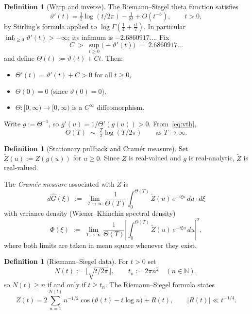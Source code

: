 \documentclass[12pt]{amsart}
\theoremstyle{definition}
\newtheorem{definition}[theorem]{Definition}
\theoremstyle{remark}
\newcommand{\N}{\mathbb{N}}
\newcommand{\Th}{\Theta}
\newcommand{\vth}{\vartheta}
\newcommand{\Zt}{\widetilde{Z}}
\begin{document}
\begin{definition}[Warp and inverse]\label{def:warp}
The Riemann--Siegel theta function satisfies
\begin{equation}\label{eq:vth}
  \vth'(t) = \tfrac{1}{2}\log(t/2\pi) - \tfrac{1}{8t} + O(t^{-3}),
  \qquad t>0,
\end{equation}
by Stirling's formula applied to $\log\Gamma(\tfrac{1}{4}+\tfrac{it}{2})$.
In particular $\inf_{t\ge 0}\vth'(t) > -\infty$; its infimum is
$-2.6860917\ldots$\;.  Fix
\begin{equation}\label{eq:C}
  C \;>\; \sup_{t\ge 0}\bigl(-\vth'(t)\bigr) \;=\; 2.6860917\ldots
\end{equation}
and define $\Th(t):=\vth(t)+Ct$.  Then:
\begin{itemize}
\item $\Th'(t)=\vth'(t)+C>0$ for all $t\ge 0$,
\item $\Th(0)=0$ (since $\vth(0)=0$),
\item $\Th:[0,\infty)\to[0,\infty)$ is a $C^\infty$ diffeomorphism.
\end{itemize}
Write $g:=\Th^{-1}$, so $g'(u)=1/\Th'(g(u))>0$.  From~\eqref{eq:vth},
\begin{equation}\label{eq:Thasym}
  \Th(T) \;\sim\; \tfrac{T}{2}\log(T/2\pi) \qquad\text{as }T\to\infty.
\end{equation}
\end{definition}

\begin{definition}[Stationary pullback and Cram\'{e}r measure]
\label{def:pullback}
Set $\Zt(u):=Z(g(u))$ for $u\ge 0$.  Since $Z$ is real-valued and
$g$ is real-analytic, $\Zt$ is real-valued.

The \emph{Cram\'{e}r measure} associated with $\Zt$ is
\begin{equation}\label{eq:Ghat}
  d\hat G(\xi) \;:=\;
  \lim_{T\to\infty}\frac{1}{\Th(T)}
  \int_0^{\Th(T)}\Zt(u)\,e^{-i\xi u}\,du\cdot d\xi
\end{equation}
with variance density (Wiener--Khinchin spectral density)
\begin{equation}\label{eq:Phi}
  \Phi(\xi) \;:=\;
  \lim_{T\to\infty}\frac{1}{\Th(T)}
  \left|\int_0^{\Th(T)}\Zt(u)\,e^{-i\xi u}\,du\right|^2,
\end{equation}
where both limits are taken in mean square whenever they exist.
\end{definition}

\begin{definition}[Riemann--Siegel data]\label{def:RS}
For $t>0$ set
\[
  N(t) := \lfloor\sqrt{t/2\pi}\rfloor, \qquad
  t_n   := 2\pi n^2 \quad(n\in\N),
\]
so $N(t)\ge n$ if and only if $t\ge t_n$.  The Riemann--Siegel formula
\cite{Titchmarsh1986,Siegel1932} states
\begin{equation}\label{eq:RS}
  Z(t) = 2\sum_{n=1}^{N(t)} n^{-1/2}
         \cos\!\bigl(\vth(t)-t\log n\bigr) + R(t),
  \qquad |R(t)| \ll t^{-1/4}.
\end{equation}
\end{definition}
\end{document}
